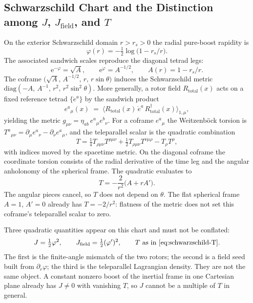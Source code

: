 \documentclass[a4paper]{article}
\begin{document}
\subsection{\texorpdfstring{Schwarzschild Chart and the Distinction among $J$, $J_{\mathrm{field}}$, and $T$}{Schwarzschild Chart and J, J field, and T}}
\label{subsec:schwarzschild-chart}

On the exterior Schwarzschild domain $r>r_s>0$ the radial pure-boost rapidity is
\[
\varphi(r) = -\tfrac12\log\bigl(1-r_s/r\bigr).
\]
The associated sandwich scales reproduce the diagonal tetrad legs:
\[
\mathrm{e}^{-\varphi}=\sqrt{A},\qquad \mathrm{e}^{\varphi}=A^{-1/2},\qquad A(r)=1-r_s/r.
\]
The coframe $\bigl(\sqrt{A},\,A^{-1/2},\,r,\,r\sin\theta\bigr)$ induces the Schwarzschild metric~\cite{schwarzschild1916} $\mathrm{diag}(-A,\,A^{-1},\,r^2,\,r^2\sin^2\theta)$. More generally, a rotor field $R_{\mathrm{total}}(x)$ acts on a fixed reference tetrad $\{\mathring{e}^a\}$ by the sandwich product
\[
e^a{}_\mu(x) \;=\; \langle R_{\mathrm{total}}(x)\, \mathring{e}^a\, R_{\mathrm{total}}^\dagger(x) \rangle_{1,\mu},
\]
yielding the metric $g_{\mu\nu}=\eta_{ab}\,e^a{}_\mu e^b{}_\nu$. For a coframe $e^a{}_\mu$ the Weitzenb\"ock torsion is $T^a{}_{\mu\nu}=\partial_\mu e^a{}_\nu-\partial_\nu e^a{}_\mu$, and the teleparallel scalar is the quadratic combination
\[
T=\tfrac14 T_{\rho\mu\nu}T^{\rho\mu\nu}+\tfrac12 T_{\rho\mu\nu}T^{\nu\mu\rho}-T_\rho T^\rho,
\]
with indices moved by the spacetime metric. On the diagonal coframe the coordinate torsion consists of the radial derivative of the time leg and the angular anholonomy of the spherical frame. The quadratic evaluates to
\begin{equation}
\label{eq:schwarzschild-T}
T=-\frac{2}{r^2}\bigl(A+r A'\bigr).
\end{equation}
The angular pieces cancel, so $T$ does not depend on $\theta$. The flat spherical frame $A=1$, $A'=0$ already has $T=-2/r^2$: flatness of the metric does not set this coframe's teleparallel scalar to zero.

Three quadratic quantities appear on this chart and must not be conflated:
\[
J=\tfrac12\varphi^2,\qquad J_{\mathrm{field}}=\tfrac12(\varphi')^2,\qquad T\text{ as in }\eqref{eq:schwarzschild-T}.
\]
The first is the finite-angle mismatch of the two rotors; the second is a field seed built from $\partial_r\varphi$; the third is the teleparallel Lagrangian density. They are not the same object. A constant nonzero boost of the inertial frame in one Cartesian plane already has $J\neq 0$ with vanishing $T$, so $J$ cannot be a multiple of $T$ in general.
\end{document}

